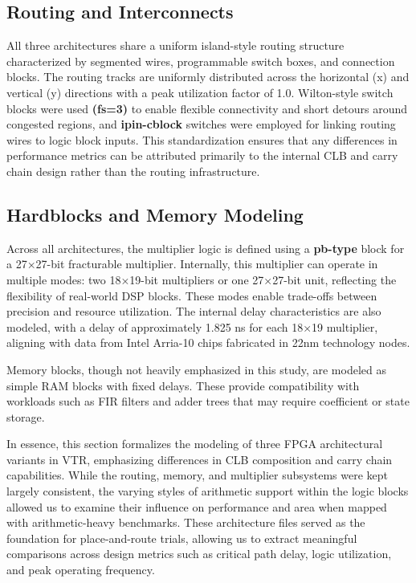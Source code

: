 \subsection{Routing and Interconnects}
All three architectures share a uniform island-style routing structure characterized by segmented wires, programmable switch boxes, and connection blocks. The routing tracks are uniformly distributed across the horizontal (x) and vertical (y) directions with a peak utilization factor of 1.0. Wilton-style switch blocks were used \textbf{(fs=3)} to enable flexible connectivity and short detours around congested regions, and \textbf{ipin-cblock} switches were employed for linking routing wires to logic block inputs. This standardization ensures that any differences in performance metrics can be attributed primarily to the internal CLB and carry chain design rather than the routing infrastructure.

\subsection{Hardblocks and Memory Modeling}
Across all architectures, the multiplier logic is defined using a \textbf{pb-type} block for a 27×27-bit fracturable multiplier. Internally, this multiplier can operate in multiple modes: two 18×19-bit multipliers or one 27×27-bit unit, reflecting the flexibility of real-world DSP blocks. These modes enable trade-offs between precision and resource utilization. The internal delay characteristics are also modeled, with a delay of approximately 1.825 ns for each 18×19 multiplier, aligning with data from Intel Arria-10 chips fabricated in 22nm technology nodes.

Memory blocks, though not heavily emphasized in this study, are modeled as simple RAM blocks with fixed delays. These provide compatibility with workloads such as FIR filters and adder trees that may require coefficient or state storage.

In essence, this section formalizes the modeling of three FPGA architectural variants in VTR, emphasizing differences in CLB composition and carry chain capabilities. While the routing, memory, and multiplier subsystems were kept largely consistent, the varying styles of arithmetic support within the logic blocks allowed us to examine their influence on performance and area when mapped with arithmetic-heavy benchmarks. These architecture files served as the foundation for place-and-route trials, allowing us to extract meaningful comparisons across design metrics such as critical path delay, logic utilization, and peak operating frequency.

